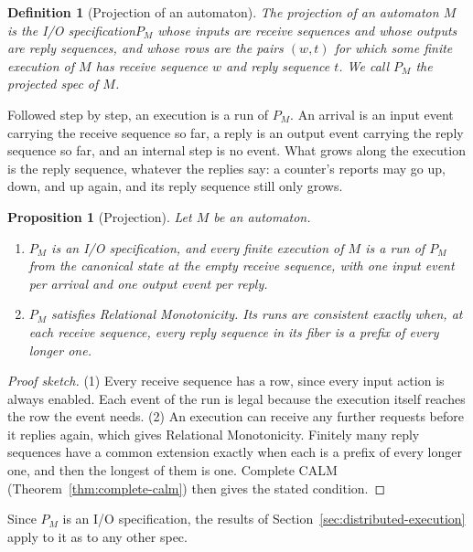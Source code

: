 \documentclass[sigconf]{cidr-2027}
\newtheorem{proposition}{Proposition}
\newtheorem{definition}{Definition}
\theoremstyle{remark}
\newcommand{\spectype}[1][]{I/O specification#1\xspace}
\begin{document}
\begin{definition}[Projection of an automaton]
\label{def:projection}
The \emph{projection} of an automaton $M$ is the \spectype $P_M$ whose inputs
are receive sequences and whose outputs are reply sequences, and whose rows
are the pairs $(w,t)$ for which some finite execution of $M$ has receive
sequence $w$ and reply sequence $t$. We call $P_M$ the \emph{projected spec}
of $M$.
\end{definition}

Followed step by step, an execution is a run of $P_M$. An arrival is an input
event carrying the receive sequence so far, a reply is an output event carrying
the reply sequence so far, and an internal step is no event. What grows along
the execution is the reply sequence, whatever the replies say: a counter's
reports may go up, down, and up again, and its reply sequence still only
grows.

\begin{proposition}[Projection]
\label{prop:projection}
Let $M$ be an automaton.
\begin{enumerate}
\item
$P_M$ is an \spectype, and every finite execution of $M$ is a run of
        $P_M$ from the canonical state at the empty receive sequence, with
        one input event per arrival and one output event per reply.
\item
$P_M$ satisfies Relational Monotonicity. Its runs are consistent
        exactly when, at each receive sequence, every reply sequence in its
        fiber is a prefix of every longer one.
\end{enumerate}
\end{proposition}

\begin{proof}[Proof sketch]
(1) Every receive sequence has a row, since every input action is always
enabled. Each event of the run is legal because the execution itself reaches
the row the event needs. (2) An execution can receive any further requests
before it replies again, which gives Relational Monotonicity. Finitely many
reply sequences have a common extension exactly when each is a prefix of every
longer one, and then the longest of them is one. Complete CALM
(Theorem~\ref{thm:complete-calm}) then gives the stated condition.
\end{proof}

Since $P_M$ is an \spectype, the results of
Section~\ref{sec:distributed-execution} apply to it as to any other spec.
\end{document}
